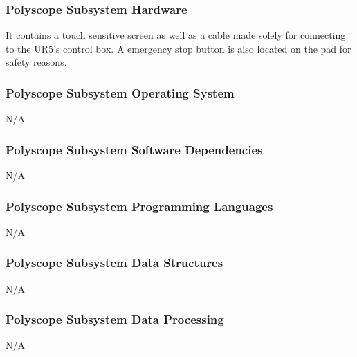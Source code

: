 \subsubsection{Polyscope Subsystem Hardware}
It contains a touch sensitive screen as well as a cable made solely for connecting to the UR5's control box. A emergency stop button is also located on the pad for safety reasons.

\subsubsection{Polyscope Subsystem Operating System}
N/A

\subsubsection{Polyscope Subsystem Software Dependencies}
N/A

\subsubsection{Polyscope Subsystem Programming Languages}
N/A

\subsubsection{Polyscope Subsystem Data Structures}
N/A

\subsubsection{Polyscope Subsystem Data Processing}
N/A